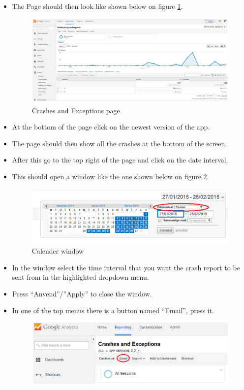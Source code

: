 \begin{itemize}
	\item The Page should then look like shown below on figure \ref{CrashesAndExceptions}.
		\begin{figure}[H]
			\includegraphics[width=0.8 \textwidth]{pictures/CrashesAndExceptions.png}
			\caption{Crashes and Exceptions page}
			\label{CrashesAndExceptions}
		\end{figure}	
	\item At the bottom of the page click on the newest version of the app.
	\item The page should then show all the crashes at the bottom of the screen.
	\item After this go to the top right of the page and click on the date interval.
	\item This should open a window like the one shown below on figure \ref{Calender}.
		\begin{figure}[H]
			\includegraphics[width=0.8 \textwidth]{pictures/Calender.png}
			\caption{Calender window}
			\label{Calender}
		\end{figure}
	\item In the window select the time interval that you want the crash report to be sent from in the highlighted dropdown menu.
	\item Press “Anvend”/”Apply” to close the window.
	\item In one of the top menus there is a button named “Email”, press it.
		\begin{figure}[H]
			\includegraphics[width=0.8 \textwidth]{pictures/Email.png}

\end{figure}
\end{itemize}
